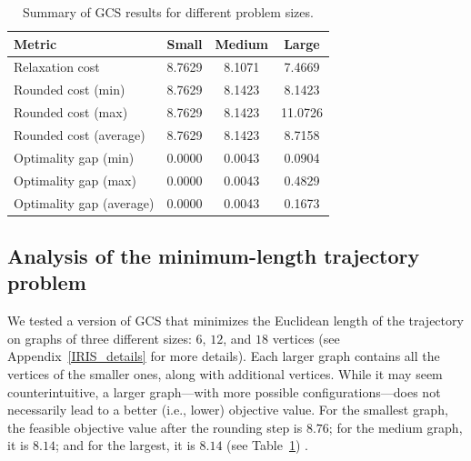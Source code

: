 
\begin{table}[t]
\centering
\caption{Summary of GCS results for different problem sizes.}
\label{table_1}
\begin{tabular}{lccc}
\toprule
\textbf{Metric} & \textbf{Small} & \textbf{Medium} & \textbf{Large} \\
\midrule
Relaxation cost               & 8.7629 & 8.1071 & 7.4669 \\
Rounded cost (min)            & 8.7629 & 8.1423 & 8.1423 \\
Rounded cost (max)            & 8.7629 & 8.1423 & 11.0726 \\
Rounded cost (average)        & 8.7629 & 8.1423 & 8.7158 \\
\midrule
Optimality gap (min)          & 0.0000 & 0.0043 & 0.0904 \\
Optimality gap (max)          & 0.0000 & 0.0043 & 0.4829 \\
Optimality gap (average)      & 0.0000 & 0.0043 & 0.1673 \\
\bottomrule
\end{tabular}
\end{table}

\subsection{Analysis of the minimum-length trajectory problem}
We tested a version of GCS that minimizes the Euclidean length of the trajectory on graphs of three different sizes: $6$, $12$, and $18$ vertices (see Appendix~\ref{IRIS_details} for more details). Each larger graph contains all the vertices of the smaller ones, along with additional vertices. While it may seem counterintuitive, a larger graph—with more possible configurations—does not necessarily lead to a better (i.e., lower) objective value. For the smallest graph, the feasible objective value after the rounding step is $8.76$; for the medium graph, it is $8.14$; and for the largest, it is $8.14$ (see Table~\ref{table_1}) .

